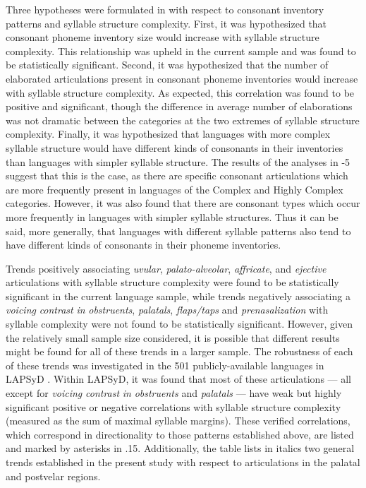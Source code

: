   Three hypotheses were formulated in  with respect to consonant inventory patterns and syllable structure complexity. First, it was hypothesized that consonant phoneme inventory size would increase with syllable structure complexity. This relationship was upheld in the current sample and was found to be statistically significant. Second, it was hypothesized that the number of elaborated articulations present in consonant phoneme inventories would increase with syllable structure complexity. As expected, this correlation was found to be positive and significant, though the difference in average number of elaborations was not dramatic between the categories at the two extremes of syllable structure complexity. Finally, it was hypothesized that languages with more complex syllable structure would have different kinds of consonants in their inventories than languages with simpler syllable structure. The results of the analyses in -5 suggest that this is the case, as there are specific consonant articulations which are more frequently present in languages of the Complex and Highly Complex categories. However, it was also found that there are consonant types which occur more frequently in languages with simpler syllable structures. Thus it can be said, more generally, that languages with different syllable patterns also tend to have different kinds of consonants in their phoneme inventories.

  Trends positively associating \textit{uvular}, \textit{palato-alveolar}, \textit{affricate}, and \textit{ejective} articulations with syllable structure complexity were found to be statistically significant in the current language sample, while trends negatively associating a \textit{voicing} \textit{contrast} \textit{in} \textit{obstruents}, \textit{palatals}, \textit{flaps/taps} and \textit{prenasalization} with syllable complexity were not found to be statistically significant. However, given the relatively small sample size considered, it is possible that different results might be found for all of these trends in a larger sample. The robustness of each of these trends was investigated in the 501 publicly-available languages in LAPSyD \citep{MaddiesonEtAl2013}. Within LAPSyD, it was found that most of these articulations — all except for \textit{voicing} \textit{contrast} \textit{in} \textit{obstruents} and \textit{palatals} — have weak but highly significant positive or negative correlations with syllable structure complexity (measured as the sum of maximal syllable margins). These verified correlations, which correspond in directionality to those patterns established above, are listed and marked by asterisks in .15. Additionally, the table lists in italics two general trends established in the present study with respect to articulations in the palatal and postvelar regions.

